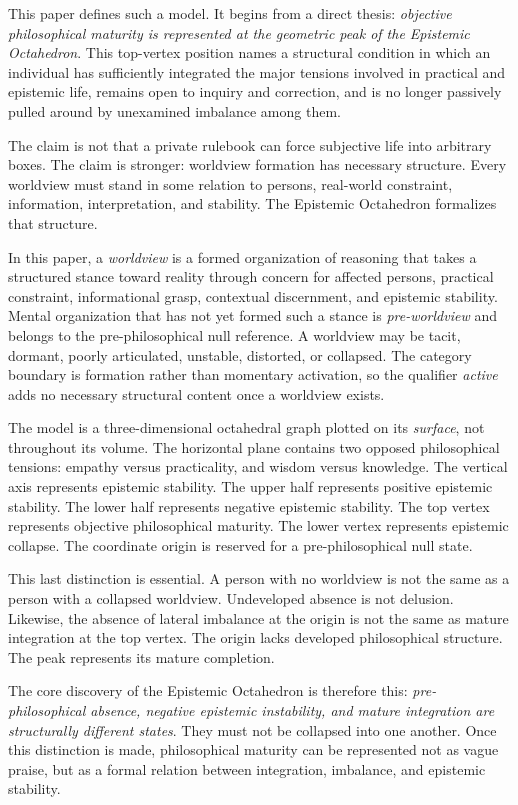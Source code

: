 \documentclass[11pt]{article}
\begin{document}
This paper defines such a model. It begins from a direct thesis: \emph{objective philosophical maturity is represented at the geometric peak of the Epistemic Octahedron}. This top-vertex position names a structural condition in which an individual has sufficiently integrated the major tensions involved in practical and epistemic life, remains open to inquiry and correction, and is no longer passively pulled around by unexamined imbalance among them.

The claim is not that a private rulebook can force subjective life into arbitrary boxes. The claim is stronger: worldview formation has necessary structure. Every worldview must stand in some relation to persons, real-world constraint, information, interpretation, and stability. The Epistemic Octahedron formalizes that structure.

In this paper, a \emph{worldview} is a formed organization of reasoning that takes a structured stance toward reality through concern for affected persons, practical constraint, informational grasp, contextual discernment, and epistemic stability. Mental organization that has not yet formed such a stance is \emph{pre-worldview} and belongs to the pre-philosophical null reference. A worldview may be tacit, dormant, poorly articulated, unstable, distorted, or collapsed. The category boundary is formation rather than momentary activation, so the qualifier \emph{active} adds no necessary structural content once a worldview exists.

The model is a three-dimensional octahedral graph plotted on its \emph{surface}, not throughout its volume. The horizontal plane contains two opposed philosophical tensions: empathy versus practicality, and wisdom versus knowledge. The vertical axis represents epistemic stability. The upper half represents positive epistemic stability. The lower half represents negative epistemic stability. The top vertex represents objective philosophical maturity. The lower vertex represents epistemic collapse. The coordinate origin is reserved for a pre-philosophical null state.

This last distinction is essential. A person with no worldview is not the same as a person with a collapsed worldview. Undeveloped absence is not delusion. Likewise, the absence of lateral imbalance at the origin is not the same as mature integration at the top vertex. The origin lacks developed philosophical structure. The peak represents its mature completion.

The core discovery of the Epistemic Octahedron is therefore this: \emph{pre-philosophical absence, negative epistemic instability, and mature integration are structurally different states}. They must not be collapsed into one another. Once this distinction is made, philosophical maturity can be represented not as vague praise, but as a formal relation between integration, imbalance, and epistemic stability.
\end{document}

